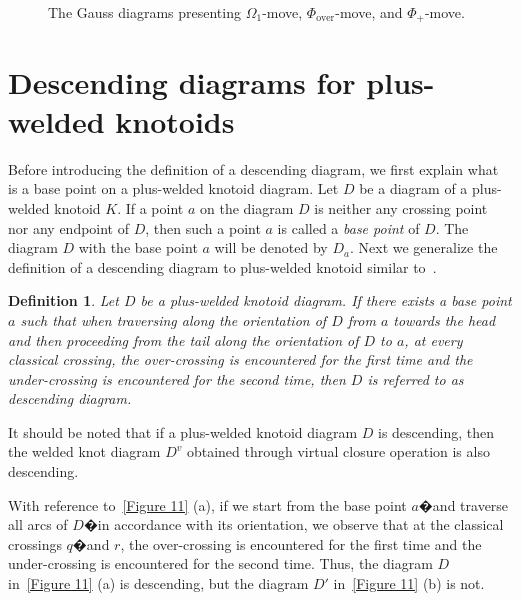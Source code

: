 \documentclass[11pt]{amsart}
\theoremstyle{noparens}
\newtheorem{definition}{Definition}[section]
\numberwithin{equation}{section}
\numberwithin{equation}{section}
\begin{document}
\begin{figure}[htbp]
\caption{The Gauss diagrams presenting $\Omega_{1}$-move, $\Phi_{\text{over}}$-move, and $\Phi_+$-move.}
\label{Figure 10}
\end{figure}

\section{Descending diagrams for plus-welded knotoids} \label{section3}

Before introducing the definition of a descending diagram, we first explain what is a base point on a plus-welded  knotoid diagram.
Let $D$ be a diagram of a plus-welded knotoid $K$. If a point $a$ on the diagram $D$ is neither any crossing point nor any endpoint of $D$, then such a point $a$ is called a \textit{base point} of $D$. The diagram $D$ with the base point $a$ will be denoted by $D_a$.
Next we generalize the definition of a descending diagram to plus-welded knotoid similar to~\citep{satoh2018crossing}.

\begin{definition} \label{Definition 3.1}
\rm{
Let $D$ be a plus-welded knotoid diagram. If there exists a base point $a$ such that when traversing along the orientation of $D$ from $a$ towards the head and then proceeding from the tail along the orientation of $D$ to $a$, at every classical crossing, the over-crossing is encountered for the first time and the under-crossing is encountered for the second time, then $D$ is referred to as \textit{descending diagram}.
}
\end{definition}

It should be noted that if a plus-welded knotoid diagram $D$ is descending, then the welded knot diagram $D^{v}$ obtained through virtual closure operation is also descending.

With reference to~\cref{Figure 11} (a), if we start from the base point $a$�and traverse all arcs of $D$�in accordance with its orientation, we observe that at the classical crossings $q$�and $r$, the over-crossing is encountered for the first time and the under-crossing is encountered for the second time. Thus, the diagram $D$ in~\cref{Figure 11} (a) is descending, but the diagram $D'$ in~\cref{Figure 11} (b) is not.  
\end{document}
